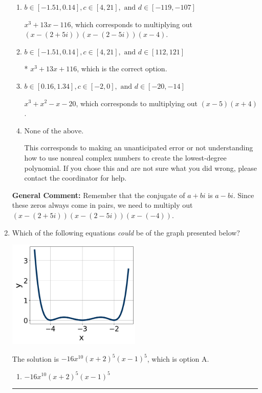 \documentclass{extbook}[14pt]
\newcommand{\litem}[1]{\item #1

\rule{\textwidth}{0.4pt}}
\begin{document}
\begin{enumerate}
{\begin{enumerate}[label=\Alph*.]
$x^{3} + x^{2} +2 x -8$, which corresponds to multiplying out $(x -2)(x + 4)$.
\item \( b \in [-1.51, 0.14], c \in [4, 21], \text{ and } d \in [-119, -107] \)

$x^{3} +13 x -116$, which corresponds to multiplying out $(x-(2 + 5 i))(x-(2 - 5 i))(x -4)$.
\item \( b \in [-1.51, 0.14], c \in [4, 21], \text{ and } d \in [112, 121] \)

* $x^{3} +13 x + 116$, which is the correct option.
\item \( b \in [0.16, 1.34], c \in [-2, 0], \text{ and } d \in [-20, -14] \)

$x^{3} + x^{2} -x -20$, which corresponds to multiplying out $(x -5)(x + 4)$.
\item \( \text{None of the above.} \)

This corresponds to making an unanticipated error or not understanding how to use nonreal complex numbers to create the lowest-degree polynomial. If you chose this and are not sure what you did wrong, please contact the coordinator for help.
\end{enumerate}

\textbf{General Comment:} Remember that the conjugate of $a+bi$ is $a-bi$. Since these zeros always come in pairs, we need to multiply out $(x-(2 + 5 i))(x-(2 - 5 i))(x-(-4))$.
}
\litem{
Which of the following equations \textit{could} be of the graph presented below?

\begin{center}
    \includegraphics[width=0.5\textwidth]{../Figures/polyGraphToFunctionA.png}
\end{center}



The solution is \( -16x^{10} (x + 2)^{5} (x - 1)^{5} \), which is option A.\begin{enumerate}[label=\Alph*.]
\item \( -16x^{10} (x + 2)^{5} (x - 1)^{5} \)


\end{enumerate}}
\end{enumerate}
\end{document}
